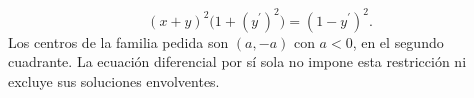 \[(x+y)^2\bigl(1+(y^{\prime})^2\bigr)=(1-y^{\prime})^2.\] Los centros de la familia pedida son $(a,-a)$ con $a<0$, en el segundo cuadrante. La ecuación diferencial por sí sola no impone esta restricción ni excluye sus soluciones envolventes.
